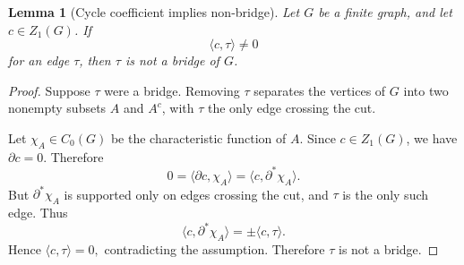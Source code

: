 \documentclass[11pt]{amsart}
\theoremstyle{theorem}
\newtheorem{lemma}{Lemma}[section]
\theoremstyle{remark}
\theoremstyle{definition}
\begin{document}
\begin{lemma}[Cycle coefficient implies non-bridge]
\label{lem:bridge}
Let \(G\) be a finite graph, and let \(c\in Z_1(G)\). If
\[
\langle c,\tau\rangle\neq 0
\]
for an edge \(\tau\), then \(\tau\) is not a bridge of \(G\).
\end{lemma}

\begin{proof}
Suppose \(\tau\) were a bridge. Removing \(\tau\) separates the vertices of
\(G\) into two nonempty subsets \(A\) and \(A^c\), with \(\tau\) the only edge
crossing the cut.

Let \(\chi_A\in C_0(G)\) be the characteristic function of \(A\). Since
$
c\in Z_1(G)
$,
we have
$
\partial c=0
$.
Therefore
\[
0
=
\langle \partial c,\chi_A\rangle
=
\langle c,\partial^*\chi_A\rangle.
\]
But \(\partial^*\chi_A\) is supported only on edges crossing the cut, and
\(\tau\) is the only such edge. Thus
\[
\langle c,\partial^*\chi_A\rangle
=
\pm \langle c,\tau\rangle.
\]
Hence
$
\langle c,\tau\rangle=0,
$
contradicting the assumption. Therefore \(\tau\) is not a bridge.
\end{proof}
\end{document}
